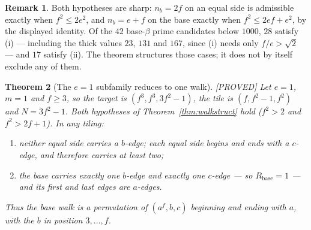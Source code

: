 \documentclass[11pt,reqno]{amsart}
\theoremstyle{plain}
\newtheorem{theorem}{Theorem}
\theoremstyle{definition}
\newtheorem{remark}[theorem]{Remark}
\newcommand{\lab}[1]{\hfill\textnormal{\footnotesize\textsc{[#1]}}}
\begin{document}
\begin{remark}\label{rem:walkscope2}
Both hypotheses are sharp: $n_b=2f$ on an equal side is admissible exactly when $f^2\le2e^2$, and
$n_b=e+f$ on the base exactly when $f^2\le2ef+e^2$, by the displayed identity. Of the $42$
base-$\beta$ prime candidates below $1000$, $28$ satisfy \textup{(i)} --- including the thick values
$23$, $131$ and $167$, since \textup{(i)} needs only $f/e>\sqrt2$ --- and $17$ satisfy
\textup{(ii)}. The theorem structures those cases; it does not by itself exclude any of them.
\end{remark}

\begin{theorem}[The $e=1$ subfamily reduces to one walk]\label{thm:e1reduce}\lab{PROVED}
Let $e=1$, $m=1$ and $f\ge3$, so the target is $(f^3,f^3,3f^2-1)$, the tile is $(f,f^2-1,f^2)$ and
$N=3f^2-1$. Both hypotheses of Theorem~\ref{thm:walkstruct} hold ($f^2>2$ and $f^2>2f+1$). In any
tiling:
\begin{enumerate}
\item[\textup{(i)}] neither equal side carries a $b$-edge; each equal side begins and ends with a
$c$-edge, and therefore carries at least two;
\item[\textup{(ii)}] the base carries exactly one $b$-edge and exactly one $c$-edge --- so
$R_{\mathrm{base}}=1$ --- and its first and last edges are $a$-edges.
\end{enumerate}
Thus the base walk is a permutation of $(a^f,b,c)$ beginning and ending with $a$, with the $b$ in
position $3,\dots,f$.
\end{theorem}
\end{document}
